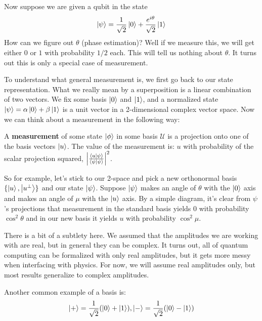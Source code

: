 Now suppose we are given a qubit in the state
\[ \ket{\psi} = \frac{1}{\sqrt{2}} \ket{0} + \frac{e^{i \theta}}{\sqrt{2}} \ket{1} \]
How can we figure out $\theta$ (phase estimation)? Well if we measure this, we will get either $0$ or $1$ with probability $1/2$ each. This will
tell us nothing about $\theta$. It turns out this is only a special case of measurement.

To understand what general measurement is, we first go back to our state representation.
What we really mean by a superposition is a linear combination of two vectors. We fix some basis $\ket{0}$ and $\ket{1}$, and a normalized state $\ket{\psi} = \alpha \ket{0} + \beta \ket{1}$
is a unit vector in a 2-dimensional complex vector space. Now we can think about a measurement in the following way:

\begin{definition}
    A \textbf{measurement} of some state $\ket{\phi}$ in some basis $\mathcal{U}$ is a projection onto one of the basis vectors $\ket{u}$. The value of the measurement is:
    $u$ with probability of the scalar projection squared, $\qty|\frac{\braket{u}{\psi}}{\braket{\psi}{\psi}}|^2$.
\end{definition}

So for example, let's stick to our 2-space and pick a new orthonormal basis $\{\ket{u}, \ket{u^{\perp}}\}$ and our state $\ket{\psi}$. Suppose $\ket{\psi}$ makes an angle of $\theta$ with the $\ket{0}$ axis and
makes an angle of $\mu$ with the $\ket{u}$ axis. By a simple diagram, it's clear from $\psi$'s projections that measurement in the standard basis yields $0$ with probability $\cos^2 \theta$ and in our new basis it yields $u$ with probability $\cos^2{\mu}$.

\begin{note}
    There is a bit of a subtlety here. We assumed that the amplitudes we are working with are real, but in general they can be complex. It turns out, all
of quantum computing can be formalized with only real amplitudes, but it gets more messy when interfacing with physics. For now,
we will assume real amplitudes only, but most results generalize to complex amplitudes.
\end{note}

Another common example of a basis is:
\[ \ket{+} = \frac{1}{\sqrt{2}} \qty(\ket{0} + \ket{1}), \ket{-} = \frac{1}{\sqrt{2}} \qty(\ket{0} - \ket{1}) \]

